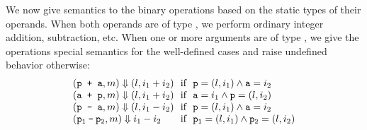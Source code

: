We now give semantics to the binary operations based on the static types of their operands. 
When both operands are of type , we perform ordinary integer addition, subtraction, etc. 
When one or more arguments are of type , we give the operations special semantics for the well-defined cases
and raise undefined behavior otherwise: %
\[
\begin{array}{@{}l@{~}l@{}}
(\code{p + a}, m) \Downarrow (l, i_1 + i_2) & \text{ if }~ \code{p} = (l, i_1) \land \code{a} = i_2\\
(\code{a + p}, m) \Downarrow (l, i_1 + i_2) & \text{ if }~ \code{a} = i_1 \land \code{p} = (l, i_2)\\
(\code{p - a}, m) \Downarrow (l, i_1 - i_2) & \text{ if }~ \code{p} = (l, i_1) \land \code{a} = i_2\\
(\mathtt{p_1 \mathbin{\code{-}} p_2}, m) \Downarrow i_1 - i_2 & \text{ if }~ \mathtt{p_1} = (l, i_1) \land \mathtt{p_2} = (l, i_2)\\

\end{array}\]
